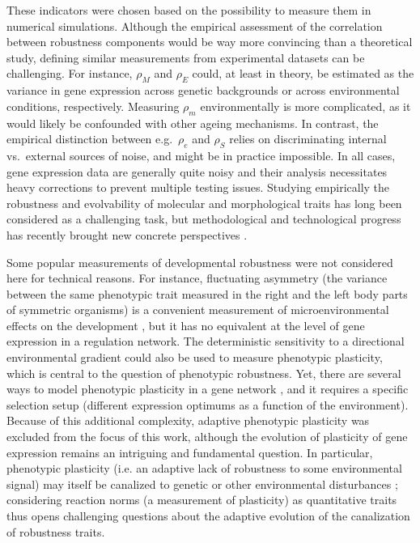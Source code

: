 \documentclass[10pt,a4paper]{article}
\newcommand{\stability}{{\rho_S}}
\newcommand{\earlyenv}{{\rho_E}}
\newcommand{\lateenv}{{\rho_e}}
\newcommand{\earlymut}{{\rho_M}}
\newcommand{\latemut}{{\rho_m}}
\begin{document}
These indicators were chosen based on the possibility to measure them in numerical simulations. Although the empirical assessment of the correlation between robustness components would be way more convincing than a theoretical study, defining similar measurements from experimental datasets can be challenging. For instance, $\earlymut$ and $\earlyenv$ could, at least in theory, be estimated as the variance in gene expression across genetic backgrounds or across environmental conditions, respectively. Measuring $\latemut$ environmentally is more complicated, as it would likely be confounded with other ageing mechanisms. In contrast, the empirical distinction between e.g.\ $\lateenv$ and $\stability$ relies on discriminating internal vs.\ external sources of noise, and might be in practice impossible. In all cases, gene expression data are generally quite noisy and their analysis necessitates heavy corrections to prevent multiple testing issues. Studying empirically the robustness and evolvability of molecular and morphological traits has long been considered as a challenging task, but methodological and technological progress has recently brought new concrete perspectives \citep{PW19}. 

Some popular measurements of developmental robustness were not considered here for technical reasons. For instance, fluctuating asymmetry (the variance between the same phenotypic trait measured in the right and the left body parts of symmetric organisms) is a convenient measurement of microenvironmental effects on the development \citep{DD01,LK05}, but it has no equivalent at the level of gene expression in a regulation network. The deterministic sensitivity to a directional environmental gradient could also be used to measure phenotypic plasticity, which is central to the question of phenotypic robustness. Yet, there are several ways to model phenotypic plasticity in a gene network \citep{Mas04,BTL21}, and it requires a specific selection setup (different expression optimums as a function of the environment). Because of this additional complexity, adaptive phenotypic plasticity was excluded from the focus of this work, although the evolution of plasticity of gene expression remains an intriguing and fundamental question. In particular, phenotypic plasticity (i.e. an adaptive lack of robustness to some environmental signal) may itself be canalized to genetic or other environmental disturbances \citep{SK94}; considering reaction norms (a measurement of plasticity) as quantitative traits thus opens challenging questions about the adaptive evolution of the canalization of robustness traits.
\end{document}
